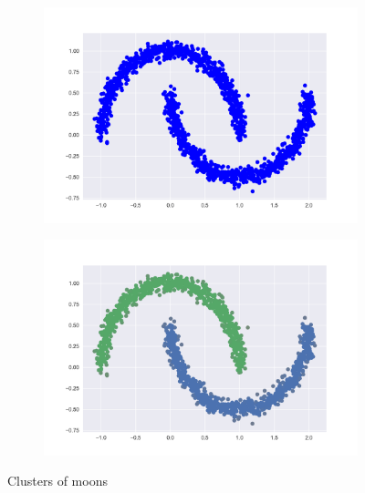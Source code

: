 \documentclass{article}
\begin{document}
\begin{figure}[h!]
	\begin{subfigure}{.5\textwidth}
		\centering
		\includegraphics[width=\linewidth]{m_figure_1.png}
		\caption{}
	\end{subfigure}%
	\begin{subfigure}{.5\textwidth}
		\centering
		\includegraphics[width=\linewidth]{m_figure_2.png}
		\caption{}
	\end{subfigure}
	\caption{Clusters of moons}
\end{figure}
\end{document}
